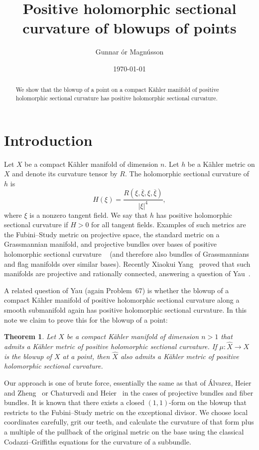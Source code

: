 \documentclass[10pt,a4paper]{amsart}
\author{Gunnar \TH\'or Magn\'usson}
\date{\today}
\title[Positive holomorphic sectional curvature of blowups of points]
{Positive holomorphic sectional\\curvature of blowups of points}
\newtheorem*{maintheo}{Theorem}
\def\ov#1{\overline{#1}}
\def\hsc{holomorphic sectional curvature}
\def\bl#1{\widehat{#1}}
\def\blX{\bl{X}}
\begin{document}
\begin{abstract}
We show that the blowup of a point on a compact K\"ahler manifold of positive
holomorphic sectional curvature has positive holomorphic sectional curvature.
\end{abstract}

\maketitle


\section*{Introduction}

Let $X$ be a compact K\"ahler manifold of dimension $n$.
Let $h$ be a K\"ahler metric on $X$ and denote its curvature tensor by $R$.
The holomorphic sectional curvature of $h$ is
$$
H(\xi)
= \frac{R(\xi, \ov\xi, \xi, \ov\xi)}{|\xi|^4},
$$
where $\xi$ is a nonzero tangent field.
We say that $h$ has positive holomorphic sectional curvature if $H > 0$ for all
tangent fields.
Examples of such metrics are the Fubini--Study metric on projective space,
the standard metric on a Grassmannian manifold,
and projective bundles over bases of positive holomorphic sectional curvature
~\cite{alvarez2018projectivized}
(and therefore also bundles of Grassmannians and flag manifolds over similar
bases).
Recently Xiaokui Yang~\cite{yang2017rc} proved that such manifolds are
projective and rationally connected, answering a question of
Yau~\cite[Problem~67]{yau1993open}.

A related question of Yau (again Problem~67) is whether the blowup of a compact
K\"ahler manifold of positive \hsc{} along a smooth submanifold again has
positive \hsc. In this note we claim to prove this for the blowup of a point:

\begin{maintheo}
Let $X$ be a compact K\"ahler manifold of dimension $n > 1$ that admits a
K\"ahler metric of positive \hsc.
If $\mu : \blX \to X$ is the blowup of $X$ at a point, then $\blX$ also admits
a K\"ahler metric of positive \hsc.
\end{maintheo}

Our approach is one of brute force, essentially the same as that of \'Alvarez,
Heier and Zheng~\cite{alvarez2018projectivized} or Chaturvedi and
Heier~\cite{chaturvedi2020hermitian} in the cases of projective bundles and
fiber bundles. It is known that there exists a closed $(1,1)$-form on the
blowup that restricts to the Fubini--Study metric on the exceptional divisor.
We choose local coordinates carefully, grit our teeth, and calculate the
curvature of that form plus a multiple of the pullback of the original metric
on the base using the classical Codazzi--Griffiths equations for the curvature
of a subbundle.
\end{document}
